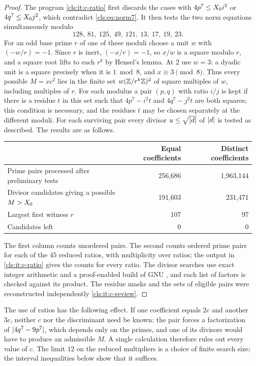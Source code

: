 \begin{proof}
The program \ref{cls:it:c-ratio} first discards the cases with $4p^7\le X_0 i^2$ or $4q^7\le X_0 j^2$, which contradict
\eqref{cls:eq:norm7}. It then tests the two norm equations simultaneously modulo
\[
             128,\ 81,\ 125,\ 49,\ 121,\ 13,\ 17,\ 19,\ 23 .
\]
For an odd base prime $r$ of one of these moduli choose a unit $w$ with $(-w/r)=-1$. Since
$r$ is inert, $(-x/r)=-1$, so $x/w$ is a square modulo $r$, and a square root lifts to each
$r^k$ by Hensel's lemma. At $2$ use $w=3$: a dyadic unit is a square precisely when it is
$1\bmod8$, and $x\equiv3\pmod8$. Thus every possible $M=xc^2$ lies in the finite set
$w(\mathbb{Z}/r^k\mathbb{Z})^2$ of square multiples of $w$, including multiples of $r$. For each modulus a
pair $(p,q)$ with ratio $i/j$ is kept if there is a residue $t$ in this set such that
$4p^7-i^2t$ and $4q^7-j^2t$ are both squares; this condition is necessary, and the
residues $t$ may be chosen separately at the different moduli. For each surviving pair
every divisor $u\le\sqrt{\lvert d\rvert}$ of $\lvert d\rvert$ is tested as described. The results are as
follows.
\begin{center}
\begin{tabular}{lrr}\toprule
 & Equal coefficients & Distinct coefficients\\\midrule
Prime pairs processed after preliminary tests & 256{,}686 & 1{,}963{,}144\\
Divisor candidates giving a possible $M>X_0$ & 191{,}603 & 231{,}471\\
Largest first witness $r$ & 107 & 97\\
Candidates left & 0 & 0\\\bottomrule
\end{tabular}
\end{center}
The first column counts unordered pairs. The second counts ordered prime pairs for each
of the $45$ reduced ratios, with multiplicity over ratios; the output in
\ref{cls:it:c-ratio} gives the counts for every ratio. The divisor searches use exact
integer arithmetic and a proof-enabled build of GNU , and each list of
factors is checked against its product. The residue masks and the sets of eligible pairs
were reconstructed independently \ref{cls:it:c-review}.
\end{proof}

The use of ratios has the following effect. If one coefficient equals $2c$ and another
$3c$, neither $c$ nor the discriminant need be known: the pair forces a factorization of
$\lvert4q^7-9p^7\rvert$, which depends only on the primes, and one of its divisors would have to
produce an admissible $M$. A single calculation therefore rules out every value of $c$.
The limit $12$ on the reduced multipliers is a choice of finite search size; the interval
inequalities below show that it suffices.

